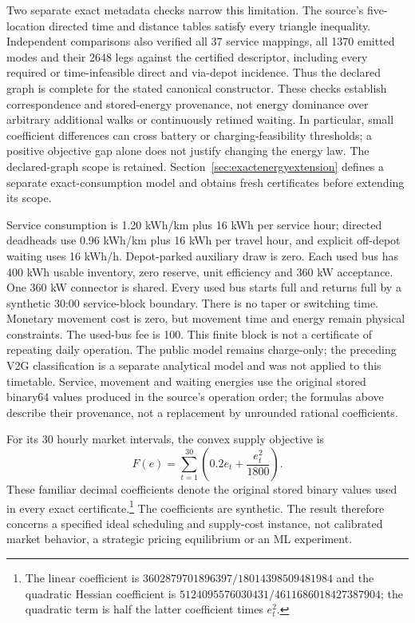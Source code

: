 Two separate exact metadata checks narrow this limitation. The source's
five-location directed time and distance tables satisfy every triangle
inequality. Independent comparisons also verified all 37 service mappings,
all 1370 emitted modes and their 2648 legs against the certified descriptor,
including every required or time-infeasible direct and via-depot incidence.
Thus the declared graph is complete for the stated canonical constructor.
These checks establish correspondence and stored-energy provenance, not
energy dominance over arbitrary additional walks or continuously retimed
waiting. In particular, small coefficient differences can cross battery or
charging-feasibility thresholds; a positive objective gap alone does not
justify changing the energy law. The declared-graph scope is retained.
Section~\ref{sec:exactenergyextension} defines a separate exact-consumption
model and obtains fresh certificates before extending its scope.

Service consumption is 1.20 kWh/km plus 16 kWh per service hour; directed
deadheads use 0.96 kWh/km plus 16 kWh per travel hour, and explicit off-depot
waiting uses 16 kWh/h. Depot-parked auxiliary draw is zero. Each used bus
has 400 kWh usable inventory, zero reserve, unit efficiency and 360 kW
acceptance. One 360 kW connector is shared. Every used bus starts full
and returns full by a synthetic 30:00 service-block boundary. There is
no taper or switching time. Monetary movement cost is zero, but movement
time and energy remain physical constraints. The used-bus fee is 100.
This finite block is not a certificate of repeating daily operation.
The public model remains charge-only; the preceding V2G classification
is a separate analytical model and was not applied to this timetable.
Service, movement and waiting energies use the original stored binary64
values produced in the source's operation order; the formulas above describe
their provenance, not a replacement by unrounded rational coefficients.

For its 30 hourly market intervals, the convex supply objective is
\begin{equation}\label{eq:publicF}
 F(e)=\sum_{t=1}^{30}\left(0.2e_t+\frac{e_t^2}{1800}\right).
\end{equation}
These familiar decimal coefficients denote the original stored binary
values used in every exact certificate.\footnote{The linear coefficient is
$3602879701896397/18014398509481984$ and the quadratic Hessian coefficient is
$5124095576030431/4611686018427387904$; the quadratic term is half the latter
coefficient times $e_t^2$.} The coefficients are synthetic. The result
therefore concerns a specified ideal scheduling and supply-cost instance,
not calibrated market behavior, a strategic pricing equilibrium or an ML
experiment.

